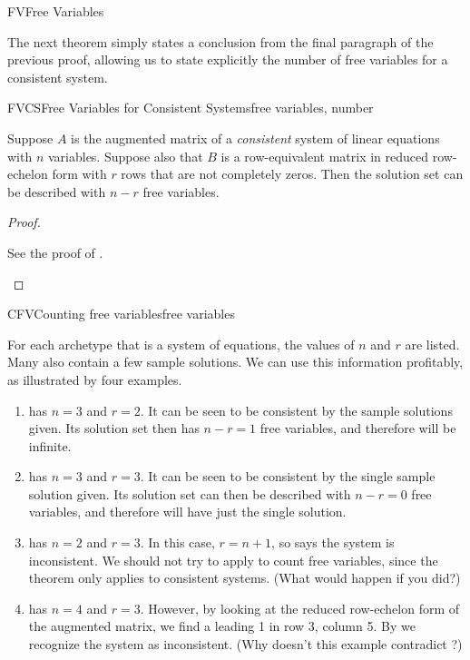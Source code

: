 \begin{subsect}{FV}{Free Variables}
%
\begin{para}The next theorem simply states a conclusion from the final paragraph of the previous proof, allowing us to state explicitly the number of free variables for a consistent system.\end{para}
%
\begin{theorem}{FVCS}{Free Variables for Consistent Systems}{free variables, number}
\begin{para}Suppose $A$ is the augmented matrix of a {\em consistent} system of linear equations with $n$ variables.  Suppose also that $B$ is a row-equivalent matrix in reduced row-echelon form with $r$ rows that are not completely zeros.  Then the solution set can be described with $n-r$ free variables.\end{para}
\end{theorem}
%
\begin{proof}
\begin{para}See the proof of .\end{para}
\end{proof}
%
\begin{example}{CFV}{Counting free variables}{free variables}
\begin{para}For each archetype that is a system of equations, the values of $n$ and $r$ are listed.  Many also contain a few sample solutions.  We can use this information profitably, as illustrated by four examples.
%
\begin{enumerate}
%
\item {} has $n=3$ and $r=2$.  It can be seen to be consistent by the sample solutions given.  Its solution set then has $n-r=1$ free variables, and therefore will be infinite.
%
\item {} has $n=3$ and $r=3$.  It can be seen to be consistent by the single sample solution given.  Its solution set can then be described with $n-r=0$ free variables, and therefore will have just the single solution.
%
\item {} has $n=2$ and $r=3$.  In this case, $r=n+1$, so  says the system is inconsistent.  We should not try to apply  to count free variables, since the theorem only applies to consistent systems. (What would happen if you did?)
%
\item {} has $n=4$ and $r=3$.  However, by looking at the reduced row-echelon form of the augmented matrix, we find a leading 1 in row 3, column 5.  By  we recognize the system as inconsistent.  (Why doesn't this example contradict ?)

\end{enumerate}
\end{para}
\end{example}
\end{subsect}
